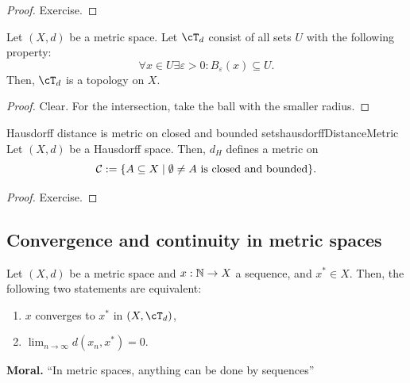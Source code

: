 \documentclass[language=english]{../../Template/TemplateLecture}
\begin{document}
\begin{proof}
    Exercise.
\end{proof}

\begin{prop}
    Let $(X,d)$ be a metric space. Let $\cT_d$ consist of all sets $U$ with the following property:
    \begin{equation}
        \forall x \in U \exists \varepsilon > 0: B_\varepsilon(x) \subseteq U.
    \end{equation}
    Then, $\cT_d$ is a topology on $X$.
\end{prop}

\begin{proof}
    Clear. For the intersection, take the ball with the smaller radius.
\end{proof}

\begin{lem}{Hausdorff distance is metric on closed and bounded sets}{hausdorffDistanceMetric}
    Let $(X,d)$ be a Hausdorff space. Then, $d_H$ defines a metric on
    \begin{equation}
        \mathcal{C} := \{A \subseteq X \mid \emptyset \neq A \text{ is closed and bounded}\}.
    \end{equation}
\end{lem}

\begin{proof}
    Exercise.
\end{proof}


\subsection{Convergence and continuity in metric spaces}

\begin{prop}
    Let $(X,d)$ be a metric space and $x : \mathbb{N} \to X$ a sequence, and $x^* \in X$. Then, the following two statements are equivalent:
    \begin{enumerate}[$(i)$]
        \item $x$ converges to $x^*$ in $(X,\cT_d)$,
        \item $\lim_{n \to \infty} d(x_n, x^*) = 0$.
    \end{enumerate}
\end{prop}

\textbf{Moral.} \enquote{In metric spaces, anything can be done by sequences}
\end{document}
